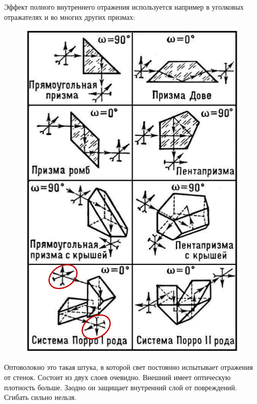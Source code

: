 \documentclass[a4paper, 12pt]{article}
\begin{document}
	Эффект полного внутреннего отражения используется например в уголковых отражателях и во многих других призмах:
		\begin{figure}[H]
			\centering
			\includegraphics[scale = 0.3]{2_3}
		\end{figure}
	Оптоволокно это такая штука, в которой свет постоянно испытывает отражения от стенок. Состоит из двух слоев очевидно. Внешний имеет оптическую плотность больше. Заодно он защищает внутренний слой от повреждений. Сгибать сильно нельзя.
\end{document}

